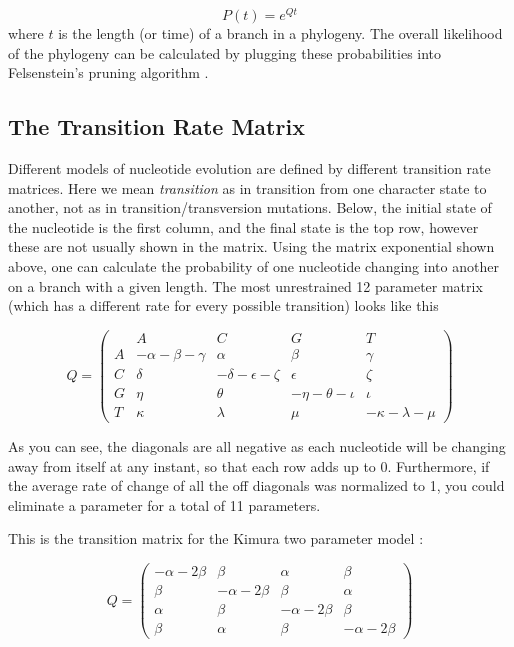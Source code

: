 \documentclass[11pt]{article}
\begin{document}
\begin{equation*}
P(t) = e^{Qt}
\end{equation*}
where $t$ is the length (or time) of a branch in a phylogeny. The overall likelihood of the
phylogeny can be calculated by plugging these probabilities into Felsenstein's pruning algorithm \citep{felsenstein1981evolutionary}.

\subsection{The Transition Rate Matrix}

Different models of nucleotide evolution are defined by different transition rate matrices. 
Here we mean \textit{transition} as in transition from one character state to another, not as in transition/transversion mutations.  
Below, the initial state of the nucleotide is the first column, and the final state is the top row, however these are not usually shown in the matrix.
Using the matrix exponential shown above, one can calculate the probability of one nucleotide changing into another on a branch with a given length.  
The most unrestrained 12 parameter matrix (which has a different rate for every possible transition) looks like this


\[ Q = \left( \begin{array}{ccccc}
  & A & C & G & T \\
A &  - \alpha - \beta - \gamma  &  \alpha  &  \beta  &  \gamma  \\ 
C &  \delta  &  - \delta - \epsilon - \zeta  &  \epsilon  &  \zeta  \\ 
G &  \eta  &  \theta  &  - \eta - \theta - \iota  &  \iota  \\ 
T &  \kappa  &  \lambda  &  \mu  &  - \kappa - \lambda - \mu  
\end{array} \right)\]

\noindent
As you can see, the diagonals are all negative as each nucleotide will be changing away from itself at any instant, so that each row adds up to 0.  
Furthermore, if the average rate of change of all the off diagonals was normalized to 1, you could eliminate a parameter for a total of 11 parameters.

This is the transition matrix for the Kimura two parameter model \citep{kimura1980simple}:

\[ Q = \left( \begin{array}{cccc}
- \alpha - 2 \beta  &  \beta  &  \alpha  &  \beta  \\ 
\beta  &  - \alpha - 2 \beta  &  \beta  &  \alpha  \\ 
\alpha  &  \beta  &  - \alpha - 2 \beta  &  \beta  \\ 
\beta  &  \alpha  &  \beta  &  - \alpha - 2 \beta   
\end{array} \right)\]
\end{document}
